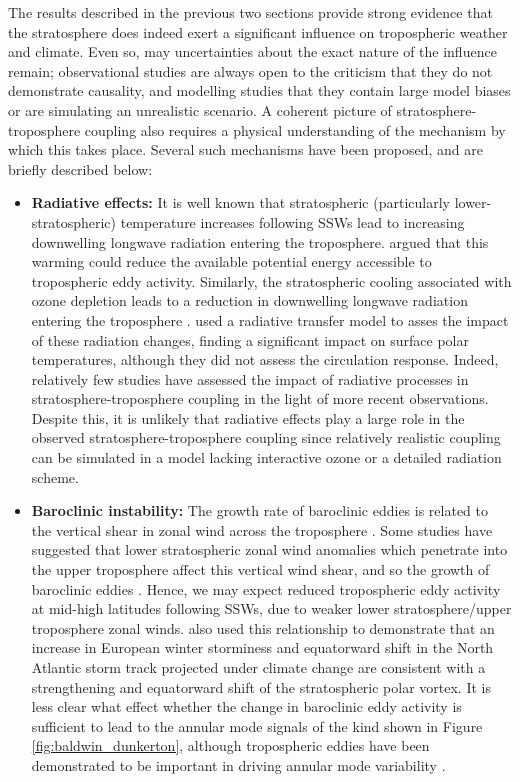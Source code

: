 The results described in the previous two sections provide strong evidence that
the stratosphere does indeed exert a significant influence on tropospheric
weather and climate. Even so, may uncertainties about the exact nature of the
influence remain; observational studies are always open to the criticism that
they do not demonstrate causality, and modelling studies that they contain large
model biases or are simulating an unrealistic scenario. A coherent picture of
stratosphere-troposphere coupling also requires a physical understanding of the
mechanism by which this takes place. Several such mechanisms have been proposed,
and are briefly described below:


\begin{itemize}
\item\textbf{Radiative effects:} It is well known that stratospheric
  (particularly lower-stratospheric) temperature increases following SSWs lead
  to increasing downwelling longwave radiation entering the troposphere.
  \citet{Ramanathan1977} argued that this warming could reduce the available
  potential energy accessible to tropospheric eddy activity. Similarly, the
  stratospheric cooling associated with ozone depletion leads to a reduction in
  downwelling longwave radiation entering the troposphere
  \citep{Forster1997a}. \citet{Grise2009} used a radiative transfer model to
  asses the impact of these radiation changes, finding a significant impact on
  surface polar temperatures, although they did not assess the circulation
  response. Indeed, relatively few studies have assessed the impact of radiative
  processes in stratosphere-troposphere coupling in the light of more recent
  observations. Despite this, it is unlikely that radiative effects play a large
  role in the observed stratosphere-troposphere coupling since relatively
  realistic coupling can be simulated in a model lacking interactive ozone or a
  detailed radiation scheme.

\item\textbf{Baroclinic instability:} The growth rate of baroclinic eddies is
  related to the vertical shear in zonal wind across the troposphere
  \citep{Eady1949}. Some studies have suggested that lower stratospheric zonal
  wind anomalies which penetrate into the upper troposphere affect this vertical
  wind shear, and so the growth of baroclinic eddies \citep{Wittman2007,
    Chen2008}. Hence, we may expect reduced tropospheric eddy activity at
  mid-high latitudes following SSWs, due to weaker lower stratosphere/upper
  troposphere zonal winds. \citet{Scaife2011} also used this relationship to
  demonstrate that an increase in European winter storminess and equatorward
  shift in the North Atlantic storm track projected under climate change are
  consistent with a strengthening and equatorward shift of the stratospheric
  polar vortex. It is less clear what effect whether the change in baroclinic
  eddy activity is sufficient to lead to the annular mode signals of the kind
  shown in Figure \ref{fig:baldwin_dunkerton}, although tropospheric eddies have
  been demonstrated to be important in driving annular mode variability
  \citep{Limpasuvan1999}.


\end{itemize}
